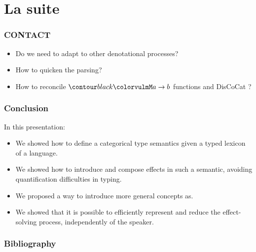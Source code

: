 \documentclass[math, english, info, noamsthm]{beamercours}
\begin{document}
\section{La suite}

\begin{frame}
	\frametitle{CONTACT}
	\begin{itemize}
		\item Do we need to adapt to other denotational processes?\pause
		\item How to quicken the parsing?\pause
		\item How to reconcile $\f{M}a \to b$ functions and DisCoCat \cite{coeckeMathematicalFoundationsCompositional2010}?
	\end{itemize}
\end{frame}

\begin{frame}
	\frametitle{Conclusion}
	In this presentation:\pause
	\begin{itemize}
		\item We showed how to define a categorical type semantics given a typed lexicon of a language.\pause
		\item We showed how to introduce and compose effects in such a semantic, avoiding quantification difficulties in typing.\pause
		\item We proposed a way to introduce more general concepts as.
		\item We showed that it is possible to efficiently represent and reduce the effect-solving process, independently of the speaker.
	\end{itemize}
\end{frame}

\appendix
\begin{frame}[allowframebreaks]
	\frametitle{Bibliography}
	
	
\end{frame}

\begin{frame}
	\resizebox{\textwidth}{8cm}{}
\end{frame}

\begin{frame}
	\resizebox{\textwidth}{!}{}
\end{frame}

\begin{frame}
	\resizebox{\textwidth}{!}{}
\end{frame}
\end{document}
